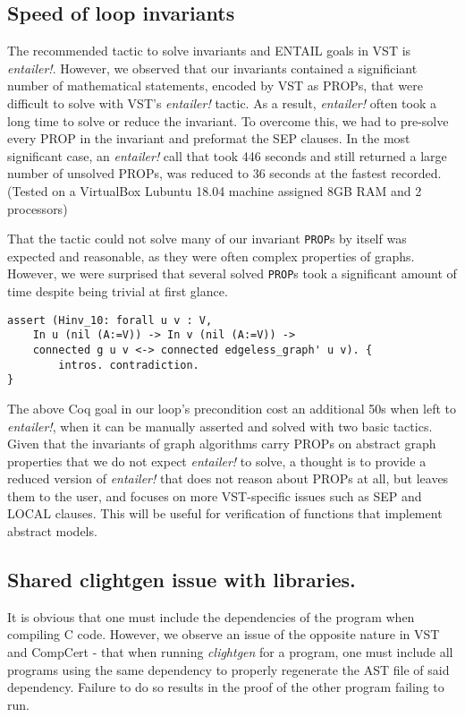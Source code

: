 \subsection{Speed of loop invariants}
The recommended tactic to solve invariants and ENTAIL goals in VST is \textit{entailer!}. However, we observed that our invariants contained a significiant number of mathematical statements, encoded by VST as PROPs, that were difficult to solve with VST's \textit{entailer!} tactic. As a result, \textit{entailer!} often took a long time to solve or reduce the invariant. To overcome this, we had to pre-solve every PROP in the invariant and preformat the SEP clauses. In the most significant case, an \textit{entailer!} call that took 446 seconds and still returned a large number of unsolved PROPs, was reduced to 36 seconds at the fastest recorded. (Tested on a VirtualBox Lubuntu 18.04 machine assigned 8GB RAM and 2 processors)

That the tactic could not solve many of our invariant \texttt{PROP}s by itself was expected and reasonable, as they were often complex properties of graphs. However, we were surprised that several solved \texttt{PROP}s took a significant amount of time despite being trivial at first glance.
\begin{lstlisting}
assert (Hinv_10: forall u v : V,
	In u (nil (A:=V)) -> In v (nil (A:=V)) ->
	connected g u v <-> connected edgeless_graph' u v). {
		intros. contradiction.
}
\end{lstlisting}
The above Coq goal in our loop's precondition cost an additional 50s when left to \textit{entailer!}, when it can be manually asserted and solved with two basic tactics.
\newline\newline
Given that the invariants of graph algorithms carry PROPs on abstract graph properties that we do not expect \textit{entailer!} to solve, a thought is to provide a reduced version of \textit{entailer!} that does not reason about PROPs at all, but leaves them to the user, and focuses on more VST-specific issues such as SEP and LOCAL clauses. This will be useful for verification of functions that implement abstract models.

\subsection{Shared clightgen issue with libraries.} It is obvious that one must include the dependencies of the program when compiling C code. However, we observe an issue of the opposite nature in VST and CompCert - that when running \textit{clightgen} for a program, one must include all programs using the same dependency to properly regenerate the AST file of said dependency. Failure to do so results in the proof of the other program failing to run.


